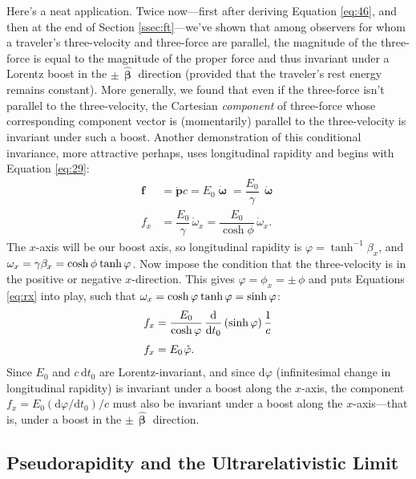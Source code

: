 \documentclass[12pt]{article}
\renewcommand{\vv}[1]{\mathbf{#1}}
\newcommand{\dd}[1]{\mathrm{d}#1}
\newcommand{\hatbeta}{\bm{\hat{\upbeta}}}
\newcommand{\vvomega}{\bm{\upomega}}
\begin{document}
Here's a neat application. Twice now---first after deriving Equation \ref{eq:46}, and then at the end of Section \ref{ssec:ft}---we've shown that among observers for whom a traveler's three-velocity and three-force are parallel, the magnitude of the three-force is equal to the magnitude of the proper force and thus invariant under a Lorentz boost in the $\pm \, \hatbeta$ direction (provided that the traveler's rest energy remains constant). More generally, we found that even if the three-force isn't parallel to the three-velocity, the Cartesian \emph{component} of three-force whose corresponding component vector is (momentarily) parallel to the three-velocity is invariant under such a boost. Another demonstration of this conditional invariance, more attractive perhaps, uses longitudinal rapidity and begins with Equation \ref{eq:29}:
\begin{equation*}
\begin{split}
\vv f &= \dot{\vv p} c = E_0 \dot{\vvomega} =  \dfrac{E_0}{\gamma} \, \mathring{\vvomega} \\[3pt]
f_x & = \dfrac{E_0}{\gamma} \, \mathring{\omega}_x = \dfrac{E_0}{\cosh{\phi}} \, \mathring{\omega}_x .
\end{split}
\end{equation*}
The $x$-axis will be our boost axis, so longitudinal rapidity is $\varphi = \tanh^{-1}{\beta_x}$, and $\omega_x = \gamma \beta_x = \cosh{\phi} \mkern1mu \tanh{\varphi}$. Now impose the condition that the three-velocity is in the positive or negative $x$-direction. This gives $\varphi = \phi_x = \pm \, \phi$ and puts Equations \ref{eq:rx} into play, such that $\omega_x = \cosh{\varphi} \mkern1mu \tanh{\varphi} = \sinh{\varphi}$:
\begin{equation*}
\begin{split}
f_x &= \dfrac{E_0}{\cosh{\varphi}} \, \dfrac{\dd}{\dd t_0} \left( \sinh{\varphi} \right) \dfrac{1}{c}  \\[3pt]
f_x &= E_0 \mkern1.5mu \mathring{\varphi} .
\end{split}
\end{equation*}
Since $E_0$ and $c \, \dd t_0$ are Lorentz-invariant, and since $\dd \varphi$ (infinitesimal change in longitudinal rapidity) is invariant under a boost along the $x$-axis, the component $f_x = E_0 (\dd \varphi / \dd t_0) / c$ must also be invariant under a boost along the $x$-axis---that is, under a boost in the $\pm \, \hatbeta$ direction.


\subsection{Pseudorapidity and the Ultrarelativistic Limit}
\end{document}
